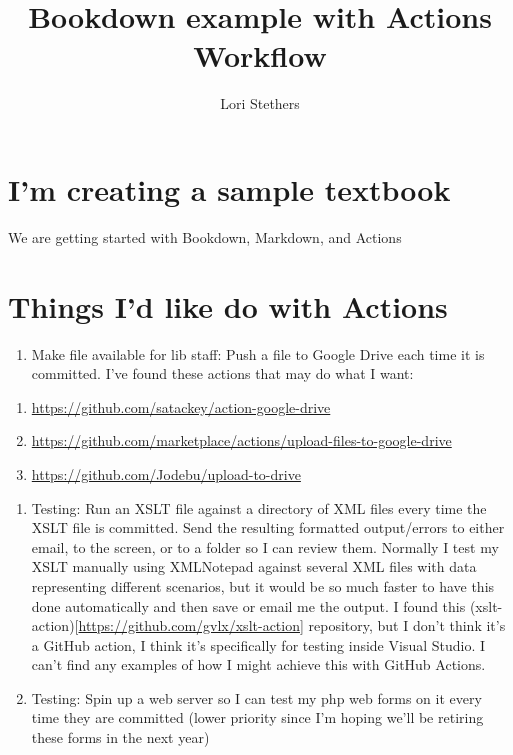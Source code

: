 \documentclass[
  openany]{book}
\title{Bookdown example with Actions Workflow}
\author{Lori Stethers}
\date{}
\providecommand{\tightlist}{%
  \setlength{\itemsep}{0pt}\setlength{\parskip}{0pt}}
\begin{document}
\maketitle

{
\setcounter{tocdepth}{1}
\tableofcontents
}
\hypertarget{im-creating-a-sample-textbook}{%
\chapter{I'm creating a sample textbook}\label{im-creating-a-sample-textbook}}

We are getting started with Bookdown, Markdown, and Actions

\hypertarget{things-id-like-do-with-actions}{%
\chapter{Things I'd like do with Actions}\label{things-id-like-do-with-actions}}

\begin{enumerate}
\def\labelenumi{\arabic{enumi}.}
\tightlist
\item
  Make file available for lib staff: Push a file to Google Drive each time it is committed. I've found these actions that may do what I want:
\end{enumerate}

\begin{enumerate}
\def\labelenumi{\alph{enumi}.}
\tightlist
\item
  \url{https://github.com/satackey/action-google-drive}
\item
  \url{https://github.com/marketplace/actions/upload-files-to-google-drive}
\item
  \url{https://github.com/Jodebu/upload-to-drive}
\end{enumerate}

\begin{enumerate}
\def\labelenumi{\arabic{enumi}.}
\setcounter{enumi}{1}
\item
  Testing: Run an XSLT file against a directory of XML files every time the XSLT file is committed. Send the resulting formatted output/errors to either email, to the screen, or to a folder so I can review them.
  Normally I test my XSLT manually using XMLNotepad against several XML files with data representing different scenarios, but it would be so much faster to have this done automatically and then save or email me the output.
  I found this (xslt-action){[}\url{https://github.com/gvlx/xslt-action}{]} repository, but I don't think it's a GitHub action, I think it's specifically for testing inside Visual Studio.
  I can't find any examples of how I might achieve this with GitHub Actions.
\item
  Testing: Spin up a web server so I can test my php web forms on it every time they are committed (lower priority since I'm hoping we'll be retiring these forms in the next year)
\end{enumerate}
\end{document}
